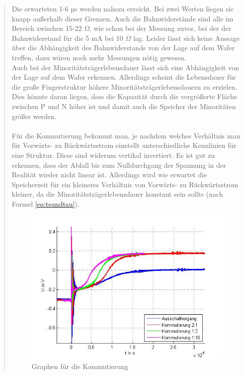 \begin{quote}
     \vspace{2em}
	
	Die erwarteten 1-6 µs werden nahezu erreicht. Bei zwei Werten liegen sie 
	knapp außerhalb dieser Grenzen. Auch die Bahnwiderstände sind alle im 
	Bereich zwischen 15-22 $\Omega$, wie schon bei der Messung zuvor, bei der 
	der Bahnwiderstand für die 5 mA bei 10 $\Omega$ lag. Leider lässt sich keine
	Aussage über die Abhängigkeit des Bahnwiderstands von der Lage auf dem 
	Wafer treffen, dazu wären noch mehr Messungen nötig gewesen.\\
	Auch bei der Minoritätsträgerlebensdauer lässt sich eine Abhängigkeit von 
	der Lage auf dem Wafer erkennen. Allerdings scheint die Lebensdauer für die
	große Fingerstruktur höhere Minoritätsträgerlebensdauern zu erzielen. Dies 
	könnte daran liegen, dass die Kapazität durch die vergrößerte Fläche 
	zwischen P und N höher ist und damit auch die Speicher der Minoritäten 
	größer werden.\\
	\\
	Für die Kommutierung bekommt man, je nachdem welches Verhältnis man für 
	Vorwärts- zu Rückwärtsstrom einstellt unterschiedliche Kennlinien für eine 
	Struktur. Diese sind widerum vertikal invertiert. Es ist gut zu erkennen, 
	dass der Abfall bis zum Nulldurchgang der Spannung in der Realität wieder 
	nicht linear ist. Allerdings wird wie erwartet die Speicherzeit für ein 
	kleineres Verhältnis von Vorwärts- zu Rückwärtsstrom kleiner, da die 
	Minoritätsträgerlebensdauer konstant sein sollte (nach Formel 
	\ref{eq:tsundtau}).
	
	
	\vspace{2em}
	
	\begin{figure}[H]
        \centering
        \includegraphics[scale=0.7]{./SchaltverhaltenBilder/Kommutierung_bild.jpg}
        \caption{Graphen für die Kommutierung} 
        \label{fig:kommgraph}
    \end{figure}
	

\end{quote}
